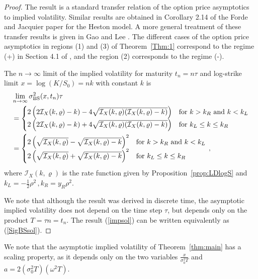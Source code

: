 \documentclass[11pt]{article}
\numberwithin{equation}{section}
\theoremstyle{plain}
\begin{document}
\begin{proof}
The result is a standard transfer relation of the option price asymptotics to
implied volatility. Similar results are obtained in Corollary 2.14 of the Forde and
Jacquier paper \cite{FJ1} for the Heston model. A more general treatment 
of these transfer results is given in Gao and Lee \cite{GaoLee}. The
different cases of the option price asymptotics in regions (1) and (3) of
Theorem~\ref{Thm:1} correspond to the regime (+) in Section 4.1 of \cite{GaoLee},
and the region (2) corresponds to the regime (-). 

The $n\to \infty$ limit of the implied volatility for maturity $t_n = n\tau$
and log-strike limit $x = \log(K/S_0) = nk$ with constant $k$ is
\begin{align}\label{impsol}
&\lim_{n\to \infty} \sigma_{\rm BS}^2(x,t_n)\tau 
\\
&=
\begin{cases}
2\left( 2 \mathcal{I}_X(k, \varrho) - k) - 
4\sqrt{\mathcal{I}_X(k, \varrho) (\mathcal{I}_X(k, \varrho) - k ) } \right) &
\text{for $k > k_R$ and $k< k_L$} \\
2\left( 2 \mathcal{I}_X(k, \varrho) - k) +
4\sqrt{\mathcal{I}_X(k, \varrho) (\mathcal{I}_X(k, \varrho) - k) } \right) & 
\text{for $k_L \leq k \leq k_R$} 
\end{cases}
\nonumber
\\
&= 
\begin{cases}
2 \left( \sqrt{ \mathcal{I}_X(k,\varrho)} - \sqrt{ \mathcal{I}_X(k, \varrho) - k} \right)^2
& \text{for $k > k_R$ and $k < k_L$} \\
2 \left( \sqrt{ \mathcal{I}_X(k, \varrho) } + \sqrt{ \mathcal{I}_X(k, \varrho) -k } \right)^2
& \text{for $k_L \leq k \leq k_R$}
\end{cases}\,,
\nonumber
\end{align}
where $\mathcal{I}_X(k, \varrho)$ is the rate function given by 
Proposition~\ref{prop:LDlogS}
and $k_L= -\frac12\rho^2\,, k_R = y_R \rho^2$.



We note that although the result was derived in discrete time, 
the asymptotic implied volatility does not depend on the
time step $\tau$, but depends only on the product $T = \tau n = t_n$. The
result (\ref{impsol}) can be written equivalently as (\ref{SigBSsol}). 
\end{proof}

We note that the asymptotic implied volatility of Theorem~\ref{thm:main}
has a scaling property, as it depends only on the two variables 
$\frac{x}{\sigma_0^2 T}$ and $a = 2(\sigma_0^2 T)(\omega^2 T)$. 
\end{document}
